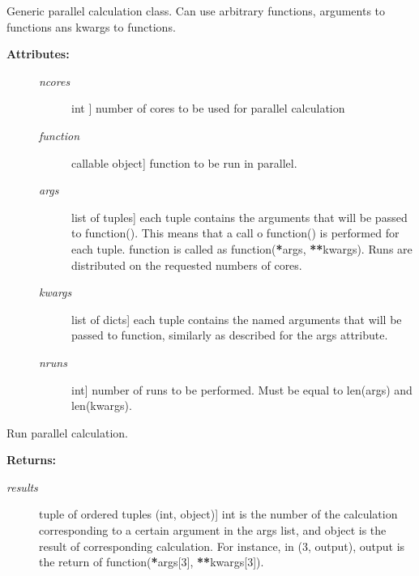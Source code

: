 \documentclass[letterpaper,10pt,english]{sphinxmanual}
\begin{document}
\begin{fulllineitems}
\label{index:encore.utils.ParallelCalculation}
Generic parallel calculation class. Can use arbitrary functions,
arguments to functions ans kwargs to functions.
\begin{description}
\item[{\textbf{Attributes:}}] \leavevmode\begin{description}
\item[{\emph{ncores}}] \leavevmode{[}int {]}
number of cores to be used for parallel calculation

\item[{\emph{function}}] \leavevmode{[}callable object{]}
function to be run in parallel.

\item[{\emph{args}}] \leavevmode{[}list of tuples{]}
each tuple contains the arguments that will be passed to function(). This means that a call o function() is performed for each tuple. function is called as function({\color{red}\bfseries{}*}args, {\color{red}\bfseries{}**}kwargs). Runs are distributed on the requested numbers of cores.

\item[{\emph{kwargs}}] \leavevmode{[}list of dicts{]}
each tuple contains the named arguments that will be passed to function, similarly as described for the args attribute.

\item[{\emph{nruns}}] \leavevmode{[}int{]}
number of runs to be performed. Must be equal to len(args) and len(kwargs).

\end{description}

\end{description}

\begin{fulllineitems}
\label{index:encore.utils.ParallelCalculation.run}
Run parallel calculation.

\textbf{Returns:}
\begin{description}
\item[{\emph{results}}] \leavevmode{[}tuple of ordered tuples (int, object){]}
int is the number of the calculation corresponding to a certain argument in the args list, and object is the result of corresponding calculation. For instance, in (3, output), output is the return of function({\color{red}\bfseries{}*}args{[}3{]}, {\color{red}\bfseries{}**}kwargs{[}3{]}).


\end{description}
\end{fulllineitems}
\end{fulllineitems}
\end{document}

